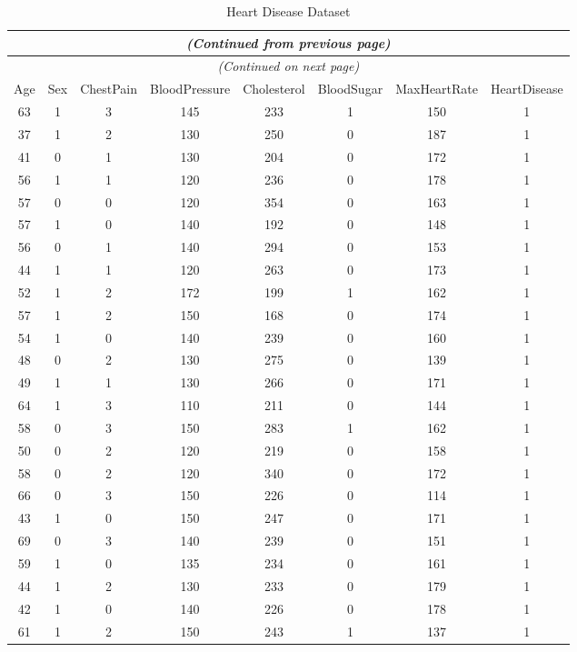 \documentclass{article}
\begin{document}
\begin{longtable}{*{8}{c}}
\caption{Heart Disease Dataset} \\

\hline
\endfirsthead

\multicolumn{8}{c}{\textit{(Continued from previous page)}} \\
\hline
\endhead

\hline
\multicolumn{8}{c}{\textit{(Continued on next page)}} \\
\hline
\endfoot

\hline
\endlastfoot
Age & Sex & ChestPain & BloodPressure & Cholesterol & BloodSugar & MaxHeartRate & HeartDisease \\ \hline
63 & 1 & 3 & 145 & 233 & 1 & 150 & 1 \\
37 & 1 & 2 & 130 & 250 & 0 & 187 & 1 \\
41 & 0 & 1 & 130 & 204 & 0 & 172 & 1 \\
56 & 1 & 1 & 120 & 236 & 0 & 178 & 1 \\
57 & 0 & 0 & 120 & 354 & 0 & 163 & 1 \\
57 & 1 & 0 & 140 & 192 & 0 & 148 & 1 \\
56 & 0 & 1 & 140 & 294 & 0 & 153 & 1 \\
44 & 1 & 1 & 120 & 263 & 0 & 173 & 1 \\
52 & 1 & 2 & 172 & 199 & 1 & 162 & 1 \\
57 & 1 & 2 & 150 & 168 & 0 & 174 & 1 \\
54 & 1 & 0 & 140 & 239 & 0 & 160 & 1 \\
48 & 0 & 2 & 130 & 275 & 0 & 139 & 1 \\
49 & 1 & 1 & 130 & 266 & 0 & 171 & 1 \\
64 & 1 & 3 & 110 & 211 & 0 & 144 & 1 \\
58 & 0 & 3 & 150 & 283 & 1 & 162 & 1 \\
50 & 0 & 2 & 120 & 219 & 0 & 158 & 1 \\
58 & 0 & 2 & 120 & 340 & 0 & 172 & 1 \\
66 & 0 & 3 & 150 & 226 & 0 & 114 & 1 \\
43 & 1 & 0 & 150 & 247 & 0 & 171 & 1 \\
69 & 0 & 3 & 140 & 239 & 0 & 151 & 1 \\
59 & 1 & 0 & 135 & 234 & 0 & 161 & 1 \\
44 & 1 & 2 & 130 & 233 & 0 & 179 & 1 \\
42 & 1 & 0 & 140 & 226 & 0 & 178 & 1 \\
61 & 1 & 2 & 150 & 243 & 1 & 137 & 1 \\

\end{longtable}
\end{document}
